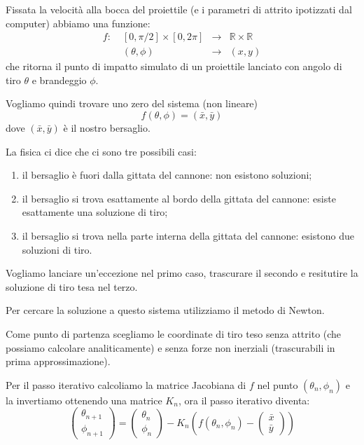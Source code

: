 \documentclass[a4paper,10pt]{article}
\newcommand{\pa}[1]{\left(#1\right)}
\newcommand{\bra}[1]{\left[#1\right]}
\begin{document}
Fissata la velocit\`a alla bocca del proiettile (e i parametri di
attrito ipotizzati dal computer) abbiamo una funzione:
\[
\begin{matrix}
  f:\; &\bra{0,\pi /2} \times \bra{0,2\pi} & \to & \mathbb{R}\times \mathbb{R}\\
  & (\theta , \phi ) & \to & (x,y)
\end{matrix}
\]
che ritorna il punto di impatto simulato di un proiettile lanciato con
angolo di tiro $\theta$ e brandeggio $\phi$.

Vogliamo quindi trovare uno zero del sistema (non lineare)
\[ f(\theta,\phi) = (\bar x, \bar y) \]
dove $(\bar x, \bar y)$ \`e il nostro bersaglio.

La fisica ci dice che ci sono tre possibili casi:
\begin{enumerate}
\item il bersaglio \`e fuori dalla gittata del cannone: non esistono
  soluzioni;
\item il bersaglio si trova esattamente al bordo della gittata del
  cannone: esiste esattamente una soluzione di tiro;
\item il bersaglio si trova nella parte interna della gittata del
  cannone: esistono due soluzioni di tiro.
\end{enumerate}

Vogliamo lanciare un'eccezione nel primo caso, trascurare il secondo e
resitutire la soluzione di tiro tesa nel terzo.

Per cercare la soluzione a questo sistema utilizziamo il metodo di
Newton.

Come punto di partenza scegliamo le coordinate di tiro teso senza
attrito (che possiamo calcolare analiticamente) e senza forze non
inerziali (trascurabili in prima approssimazione).

Per il passo iterativo calcoliamo la matrice Jacobiana di $f$ nel
punto $\pa{\theta_n, \phi_n}$ e la invertiamo ottenendo una matrice
$K_n$, ora il passo iterativo diventa:
\[
\begin{pmatrix}
  \theta_{n+1}\\
  \phi_{n+1}
\end{pmatrix} 
=
\begin{pmatrix}
  \theta_{n}\\
  \phi_{n}  
\end{pmatrix}
- K_n \pa{ f(\theta _n, \phi_n) - 
  \begin{pmatrix}
    \bar x\\
    \bar y
  \end{pmatrix}
  }
\]
\end{document}
